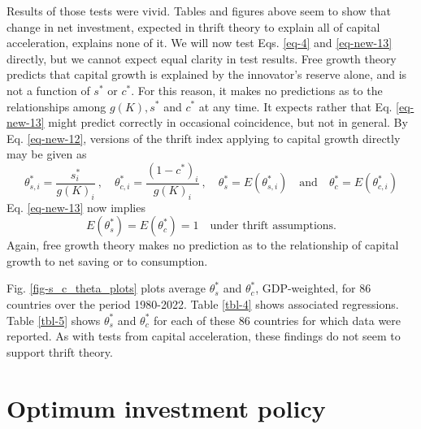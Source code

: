 Results of those tests were vivid. Tables and figures above seem to show that change in net investment, expected in thrift theory to explain all of capital acceleration, explains none of it. We will now test Eqs. \eqref{eq-4} and \eqref{eq-new-13} directly, but we cannot expect equal clarity in test results. Free growth theory predicts that capital growth is explained by the innovator's reserve alone, and is not a function of \(s^*\) or \(c^*\). For this reason, it makes no predictions as to the relationships among \(g(K), s^*\) and \(c^*\) at any time. It expects rather that Eq. \eqref{eq-new-13} might predict correctly in occasional coincidence, but not in general.
%
By Eq. \eqref{eq-new-12}, versions of the thrift index applying to capital growth directly may be given as
%
\begin{equation*}
   \theta^*_{s,i} = \frac{s^*_i}{g(K)_i}\ , \quad \theta^*_{c,i} = \frac{(1-c^*)_i}{g(K)_i}\ , \quad \theta^*_s = E(\theta^*_{s,i}) \quad \text{and} \quad \theta^*_{c} = E(\theta^*_{c,i})
\end{equation*}
%
Eq. \eqref{eq-new-13} now implies
%
\begin{equation}
    E(\theta^*_s) = E(\theta^*_c) = 1 \quad \text{under thrift assumptions.} \label{eq-22}
\end{equation}
%
Again, free growth theory makes no prediction as to the relationship of capital growth to net saving or to consumption.

Fig. \ref{fig-s_c_theta_plots} plots average \(\theta^*_s\) and \(\theta^*_c\), GDP-weighted, for 86 countries over the period 1980-2022.
Table \ref{tbl-4} shows associated regressions.
Table \ref{tbl-5} shows \(\theta^*_s\) and \(\theta^*_c\) for each of these 86 countries for which data were reported.
As with tests from capital acceleration, these findings do not seem to support thrift theory.
%


\hypertarget{optimum-investment-policy}{%
\section{Optimum investment policy}\label{optimum-investment-policy}}

